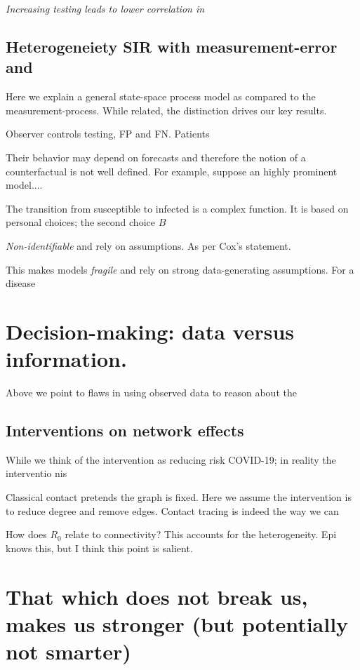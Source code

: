 \documentclass[12pt]{article}
\numberwithin{equation}{section}
\theoremstyle{plain}
\begin{document}
\emph{Increasing testing leads to lower correlation in}


\subsection{Heterogeneiety  SIR with measurement-error and }

Here we explain a general state-space process model as compared to the measurement-process.  While related, the distinction drives our key results.

Observer controls testing, FP and FN.  Patients

Their behavior may depend on forecasts and therefore the notion of a counterfactual is not well defined.  For example, suppose an highly prominent model....

The transition from susceptible to infected is a complex function.  It is based on personal choices;  the second choice
$B$

\emph{Non-identifiable} and rely on assumptions.  As per Cox's statement.

This makes models \emph{fragile} and rely on strong data-generating assumptions.  For a disease

\section{Decision-making: data versus information.}

Above we point to flaws in using observed data to reason about the

\subsection{Interventions on network effects}

While we think of the intervention as reducing risk COVID-19; in reality the interventio nis

Classical contact pretends the graph is fixed.  Here we assume the intervention is to reduce degree and remove edges.  Contact tracing is indeed the way we can

How does $R_0$ relate to connectivity?  This accounts for the heterogeneity. Epi knows this, but I think this point is salient.



\section{That which does not break us, makes us stronger (but potentially not smarter)}
\end{document}
